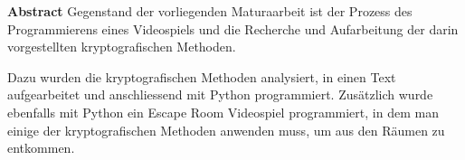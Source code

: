 \textbf{Abstract}
Gegenstand der vorliegenden Maturaarbeit ist der Prozess des Programmierens eines Videospiels und die Recherche und Aufarbeitung der darin vorgestellten kryptografischen Methoden.

Dazu wurden die kryptografischen Methoden analysiert, in einen Text aufgearbeitet und anschliessend mit Python programmiert. Zusätzlich wurde ebenfalls mit Python ein Escape Room Videospiel programmiert, in dem man einige der kryptografischen Methoden anwenden muss, um aus den Räumen zu entkommen.

